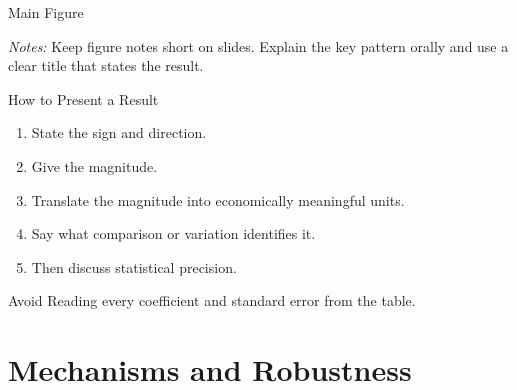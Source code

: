 \documentclass[10pt,aspectratio=169]{beamer}
\begin{document}
\begin{frame}{Main Figure}
\centering


\vspace{0.5em}
\begin{minipage}{0.85\textwidth}
\footnotesize
\textit{Notes:} Keep figure notes short on slides. Explain the key pattern orally and use a clear title that states the result.
\end{minipage}
\end{frame}

\begin{frame}{How to Present a Result}
\begin{enumerate}
  \item State the sign and direction.
  \item Give the magnitude.
  \item Translate the magnitude into economically meaningful units.
  \item Say what comparison or variation identifies it.
  \item Then discuss statistical precision.
\end{enumerate}

\vspace{0.7em}
\begin{alertblock}{Avoid}
Reading every coefficient and standard error from the table.
\end{alertblock}
\end{frame}

\section{Mechanisms and Robustness}
\end{document}
